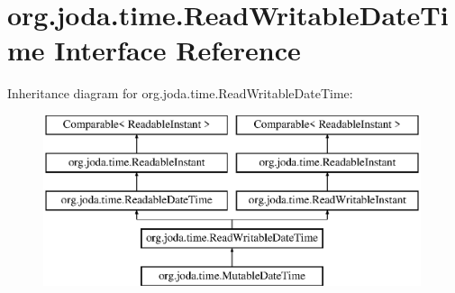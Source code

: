 \hypertarget{interfaceorg_1_1joda_1_1time_1_1_read_writable_date_time}{\section{org.\-joda.\-time.\-Read\-Writable\-Date\-Time Interface Reference}
\label{interfaceorg_1_1joda_1_1time_1_1_read_writable_date_time}
}
Inheritance diagram for org.\-joda.\-time.\-Read\-Writable\-Date\-Time\-:\begin{figure}[H]
\begin{center}
\leavevmode
\includegraphics[height=5.000000cm]{interfaceorg_1_1joda_1_1time_1_1_read_writable_date_time}
\end{center}
\end{figure}
